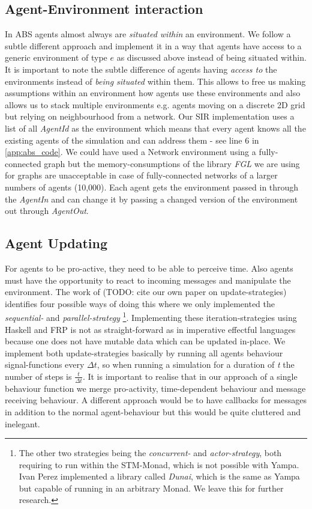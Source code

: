 \subsection{Agent-Environment interaction}
In ABS agents almost always are \textit{situated within} an environment. We follow a subtle different approach and implement it in a way that agents have access to a generic environment of type $e$ as discussed above instead of being situated within. It is important to note the subtle difference of agents having \textit{access to} the environments instead of \textit{being situated} within them. This allows to free us making assumptions within an environment how agents use these environments and also allows us to stack multiple environments e.g. agents moving on a discrete 2D grid but relying on neighbourhood from a network.
Our SIR implementation uses a list of all \textit{AgentId} as the environment which means that every agent knows all the existing agents of the simulation and can address them - see line 6 in \ref{app:abs_code}. We could have used a Network environment using a fully-connected graph but the memory-consumptions of the library \textit{FGL} we are using for graphs are unacceptable in case of fully-connected networks of a larger numbers of agents (10,000). Each agent gets the environment passed in through the \textit{AgentIn} and can change it by passing a changed version of the environment out through \textit{AgentOut}. 

\subsection{Agent Updating}
For agents to be pro-active, they need to be able to perceive time. Also agents must have the opportunity to react to incoming messages and manipulate the environment. The work of (TODO: cite our own paper on update-strategies) identifies four possible ways of doing this where we only implemented the \textit{sequential-} and \textit{parallel-strategy} \footnote{The other two strategies being the  \textit{concurrent-} and \textit{actor-strategy}, both requiring to run within the STM-Monad, which is not possible with Yampa. Ivan Perez \cite{perez_functional_2016} implemented a library called \textit{Dunai}, which is the same as Yampa but capable of running in an arbitrary Monad. We leave this for further research.}. Implementing these iteration-strategies using Haskell and FRP is not as straight-forward as in imperative effectful languages because one does not have mutable data which can be updated in-place. 
We implement both update-strategies basically by running all agents behaviour signal-functions every $\Delta t$, so when running a simulation for a duration of \textit{t} the number of steps is $\frac{t}{\Delta t}$. It is important to realise that in our approach of a single behaviour function we merge pro-activity, time-dependent behaviour and message receiving behaviour. A different approach would be to have callbacks for messages in addition to the normal agent-behaviour but this would be quite cluttered and inelegant.

